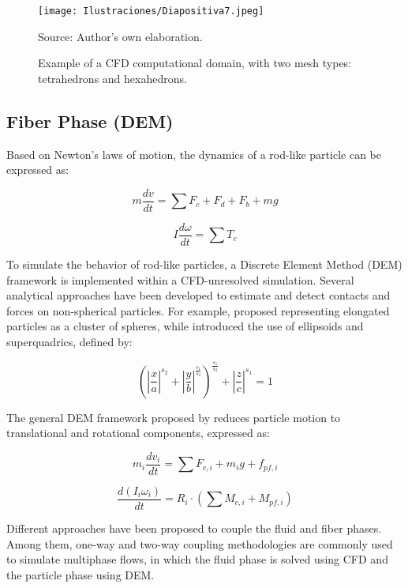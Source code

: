 \begin{figure}
    \centering
    \texttt{[image: Ilustraciones/Diapositiva7.jpeg]}
    \caption{Example of a CFD computational domain, with two mesh types: tetrahedrons and hexahedrons.}
    Source: Author's own elaboration.
    \label{cfddomain}
\end{figure}

\subsection{Fiber Phase (DEM)}

Based on Newton's laws of motion, the dynamics of a rod-like particle can be expressed as:

\begin{equation}
    m\frac{dv}{dt} = \sum F_c + F_d + F_b + mg
\end{equation}

\begin{equation}
    I\frac{d\omega}{dt} = \sum T_c
\end{equation}

To simulate the behavior of rod-like particles, a Discrete Element Method (DEM) framework is implemented within a CFD-unresolved simulation. Several analytical approaches have been developed to estimate and detect contacts and forces on non-spherical particles. For example, \cite{favier1999shape} proposed representing elongated particles as a cluster of spheres, while \cite{williams1992superquadrics} introduced the use of ellipsoids and superquadrics, defined by:

\begin{equation}
    \left( \left| \frac{x}{a} \right|^{s_2} + \left| \frac{y}{b} \right|^{\tfrac{s_1}{s_2}} \right)^{\tfrac{s_1}{s_2}}
    + \left| \frac{z}{c} \right|^{s_1} = 1
\end{equation}

The general DEM framework proposed by \cite{cundall1979discrete} reduces particle motion to translational and rotational components, expressed as:

\begin{equation}
    m_i\frac{dv_i}{dt} = \sum F_{c,i} + m_ig + f_{pf,i}
\end{equation}

\begin{equation}
    \frac{d(I_i \omega_i)}{dt} = R_i \cdot (\sum M_{c,i} + M_{pf,i})
\end{equation}

Different approaches have been proposed to couple the fluid and fiber phases. Among them, one-way and two-way coupling methodologies are commonly used to simulate multiphase flows, in which the fluid phase is solved using CFD and the particle phase using DEM.

